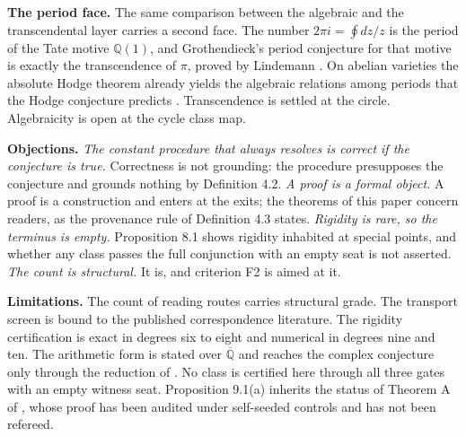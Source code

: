 \documentclass[10pt,twocolumn]{article}
\begin{document}
\textbf{The period face.} The same comparison between the algebraic and
the transcendental layer carries a second face. The number
\(2\pi i=\oint dz/z\) is the period of the Tate motive
\(\mathbb{Q}(1)\), and Grothendieck's period conjecture for that motive
is exactly the transcendence of \(\pi\), proved by Lindemann
\cite{lindemann1882,kz2001}. On abelian varieties the absolute Hodge
theorem already yields the algebraic relations among periods that the
Hodge conjecture predicts \cite{deligne1982,deligne2006}. Transcendence
is settled at the circle. Algebraicity is open at the cycle class map.

\textbf{Objections.} \emph{The constant procedure that always resolves
is correct if the conjecture is true.} Correctness is not grounding: the
procedure presupposes the conjecture and grounds nothing by Definition
4.2. \emph{A proof is a formal object.} A proof is a construction and
enters at the exits; the theorems of this paper concern readers, as the
provenance rule of Definition 4.3 states. \emph{Rigidity is rare, so the
terminus is empty.} Proposition 8.1 shows rigidity inhabited at special
points, and whether any class passes the full conjunction with an empty
seat is not asserted. \emph{The count is structural.} It is, and
criterion F2 is aimed at it.

\textbf{Limitations.} The count of reading routes carries structural
grade. The transport screen is bound to the published correspondence
literature. The rigidity certification is exact in degrees six to eight
and numerical in degrees nine and ten. The arithmetic form is stated
over \(\overline{\mathbb{Q}}\) and reaches the complex conjecture only
through the reduction of \cite{voisin2007}. No class is certified here
through all three gates with an empty witness seat. Proposition 9.1(a)
inherits the status of Theorem A of \cite{islam2026w}, whose proof has
been audited under self-seeded controls and has not been refereed.
\end{document}

